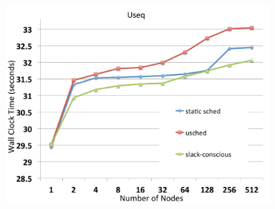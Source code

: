 \documentclass[serif,mathserif,final]{beamer}
\begin{document}
\begin{frame}{}
\begin{columns}[t]
\begin{column}{0.28\linewidth}
\begin{block}{}
\begin{columns}[t]
\begin{column}{0.98\columnwidth}
\begin{columns}
\begin{column}{0.07\columnwidth}
\begin{figure}[htb]
            \end{figure}
          \end{column}\begin{column}{0.07\columnwidth}
          \end{column}
        \end{columns}
             \begin{figure}[h]
               \caption{}
             \end{figure}
           \end{column}\begin{column}{0.01\columnwidth}\end{column}
         \end{columns}
      \end{block}
    \vspace{1.5ex} 

      \begin{block}{}
        \begin{columns}
          \begin{column}{0.05\columnwidth}\end{column}
          \begin{column}{0.9\columnwidth}  
            \begin{figure}[htb]
              \centering
              \includegraphics[width=0.44\columnwidth]{images/AMG-scaling-rzuseq}
              \caption{   }
            \end{figure}
          \end{column}
          \begin{column}{0.05\columnwidth}\end{column}
        \end{columns}
      \end{block}

      \vspace{1.5ex}       
      \begin{block}{} 
      \end{block}
    \end{column}%

  \end{columns}
 \end{frame}
\end{document}

